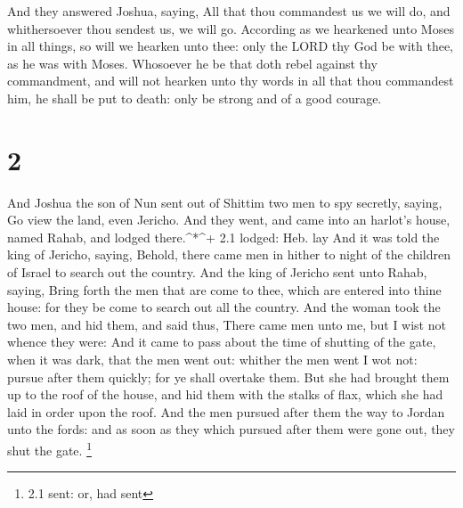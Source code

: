  And they answered Joshua, saying, All that thou commandest
us we will do, and whithersoever thou sendest us, we will go.
 According as we hearkened unto Moses in all things, so
will we hearken unto thee: only the LORD thy God be with thee, as he was
with Moses.  Whosoever he be that doth rebel against thy
commandment, and will not hearken unto thy words in all that thou
commandest him, he shall be put to death: only be strong and of a good
courage.

\hypertarget{section-1}{%
\section{2}\label{section-1}}

 And Joshua the son of Nun sent out of Shittim two men to
spy secretly, saying, Go view the land, even Jericho. And they went, and
came into an harlot's house, named Rahab, and lodged there.\^{}*\^{}+
2.1 lodged: Heb. lay  And it was told the king of Jericho,
saying, Behold, there came men in hither to night of the children of
Israel to search out the country.  And the king of Jericho
sent unto Rahab, saying, Bring forth the men that are come to thee,
which are entered into thine house: for they be come to search out all
the country.  And the woman took the two men, and hid them,
and said thus, There came men unto me, but I wist not whence they were:
 And it came to pass about the time of shutting of the gate,
when it was dark, that the men went out: whither the men went I wot not:
pursue after them quickly; for ye shall overtake them.  But
she had brought them up to the roof of the house, and hid them with the
stalks of flax, which she had laid in order upon the roof. 
And the men pursued after them the way to Jordan unto the fords: and as
soon as they which pursued after them were gone out, they shut the gate.
\footnote{2.1 sent: or, had sent}

